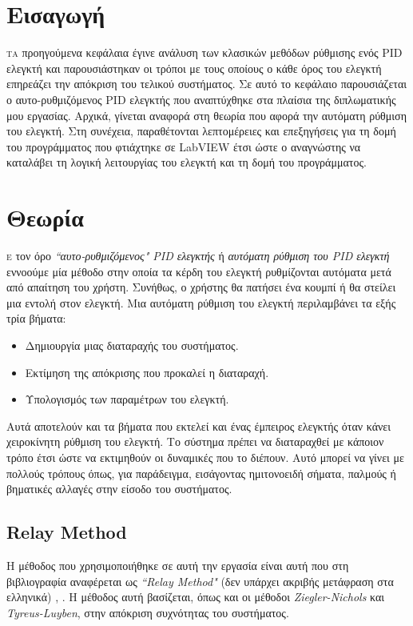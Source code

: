 


\section{Εισαγωγή}

\lettrine[findent=2pt]{}{τα} προηγούμενα κεφάλαια έγινε ανάλυση των κλασικών μεθόδων ρύθμισης ενός PID ελεγκτή και παρουσιάστηκαν οι τρόποι με τους οποίους ο κάθε όρος του ελεγκτή επηρεάζει την απόκριση του τελικού συστήματος. Σε αυτό το κεφάλαιο παρουσιάζεται ο αυτο-ρυθμιζόμενος PID ελεγκτής που αναπτύχθηκε στα πλαίσια της διπλωματικής μου εργασίας. Αρχικά, γίνεται αναφορά στη θεωρία που αφορά την αυτόματη ρύθμιση του ελεγκτή. Στη συνέχεια, παραθέτονται λεπτομέρειες και επεξηγήσεις για τη δομή του προγράμματος που φτιάχτηκε σε LabVIEW έτσι ώστε ο αναγνώστης να καταλάβει τη λογική λειτουργίας του ελεγκτή και τη δομή του προγράμματος.

\section{Θεωρία}

\lettrine[findent=2pt]{}{ε} τον όρο \emph{``αυτο-ρυθμιζόμενος" PID ελεγκτής} ή \emph{αυτόματη ρύθμιση του PID ελεγκτή} εννοούμε μία μέθοδο στην οποία τα κέρδη του ελεγκτή ρυθμίζονται αυτόματα μετά από απαίτηση του χρήστη. Συνήθως, ο χρήστης θα πατήσει ένα κουμπί ή θα στείλει μια εντολή στον ελεγκτή. Μια αυτόματη ρύθμιση του ελεγκτή περιλαμβάνει τα εξής τρία βήματα:

\begin{itemize}
	\item Δημιουργία μιας διαταραχής του συστήματος.
	\item Εκτίμηση της απόκρισης που προκαλεί η διαταραχή.
	\item Υπολογισμός των παραμέτρων του ελεγκτή.
\end{itemize}
Αυτά αποτελούν και τα βήματα που εκτελεί και ένας έμπειρος ελεγκτής όταν κάνει χειροκίνητη ρύθμιση του ελεγκτή. Το σύστημα πρέπει να διαταραχθεί με κάποιον τρόπο έτσι ώστε να εκτιμηθούν οι δυναμικές που το διέπουν. Αυτό μπορεί να γίνει με πολλούς τρόπους όπως, για παράδειγμα, εισάγοντας ημιτονοειδή σήματα, παλμούς ή βηματικές αλλαγές στην είσοδο του συστήματος.

\subsection{Relay Method}
Η μέθοδος που χρησιμοποιήθηκε σε αυτή την εργασία είναι αυτή που στη βιβλιογραφία αναφέρεται ως \emph{``Relay Method"} (δεν υπάρχει ακριβής μετάφραση στα ελληνικά) \cite{astrom}, \cite{vandoren}. Η μέθοδος αυτή βασίζεται, όπως και οι μέθοδοι \emph{Ziegler-Nichols} και \emph{Tyreus-Luyben}, στην απόκριση συχνότητας του συστήματος.


